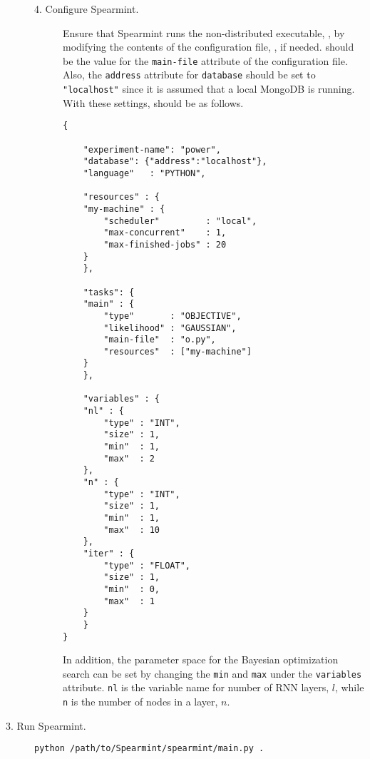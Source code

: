\begin{description}
\begin{description}
  \item[4. Configure \textsf{Spearmint}.] \hfill
    
    Ensure that \textsf{Spearmint} runs the non-distributed executable, , by modifying the contents of the configuration file, , if needed.
     should be the value for the \texttt{main-file} attribute of the configuration file.
    Also, the \texttt{address} attribute for \texttt{database} should be set to \texttt{"localhost"} since it is assumed that a local \textsf{MongoDB} is running.
    With these settings,  should be as follows.

\begin{verbatim}
{

    "experiment-name": "power",
    "database": {"address":"localhost"},
    "language"   : "PYTHON",
    
    "resources" : {
	"my-machine" : {
	    "scheduler"         : "local",
	    "max-concurrent"    : 1,
	    "max-finished-jobs" : 20
	}
    },

    "tasks": {
	"main" : {
	    "type"       : "OBJECTIVE",
	    "likelihood" : "GAUSSIAN",
	    "main-file"  : "o.py",
	    "resources"  : ["my-machine"]
	}
    },
    
    "variables" : {
	"nl" : {
	    "type" : "INT",
	    "size" : 1,
	    "min"  : 1,
	    "max"  : 2
	},
	"n" : {
	    "type" : "INT",
	    "size" : 1,
	    "min"  : 1,
	    "max"  : 10
	},
	"iter" : {
	    "type" : "FLOAT",
	    "size" : 1,
	    "min"  : 0,
	    "max"  : 1
	}
    }
}
\end{verbatim}

    In addition, the parameter space for the Bayesian optimization search can be set by changing the \texttt{min} and \texttt{max} under the \texttt{variables} attribute.
    \texttt{nl} is the variable name for number of RNN layers, $l$, while \texttt{n} is the number of nodes in a layer, $n$.



\end{description}

\item[3. Run \textsf{Spearmint}.] \hfill

\begin{verbatim}
python /path/to/Spearmint/spearmint/main.py .    
\end{verbatim}


\end{description}


